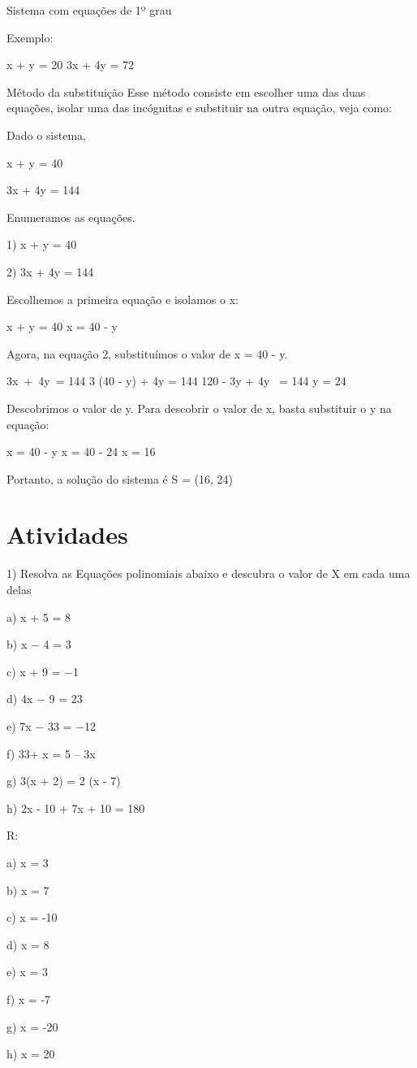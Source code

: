 Sistema com equações de 1º grau

Exemplo:

x + y = 20 3x + 4y = 72

Método da substituição Esse método consiste em escolher uma das duas
equações, isolar uma das incógnitas e substituir na outra equação, veja
como:

Dado o sistema,

x + y = 40

3x + 4y = 144

Enumeramos as equações.

1) x + y = 40

2) 3x + 4y = 144

Escolhemos a primeira equação e isolamos o x:

x + y = 40 x = 40 - y

Agora, na equação 2, substituímos o valor de x = 40 - y.

3x~+~4y~= 144 3 (40 - y) + 4y = 144 120 - 3y + 4y~ = 144 y = 24

Descobrimos o valor de y. Para descobrir o valor de x, basta substituir
o y na equação:

x = 40 - y x = 40 - 24 x = 16

Portanto, a solução do sistema é S = (16, 24)

\section{Atividades}

1) Resolva as Equações polinomiais abaixo e descubra o valor de X em
cada uma delas

a) x + 5 = 8

b) x − 4 = 3

c) x + 9 = −1

d) 4x − 9 = 23

e) 7x − 33 = −12

f) 33+ x = 5 -- 3x

g) 3(x + 2) = 2 (x - 7)

h) 2x - 10 + 7x + 10 = 180

R:

a) x = 3

b) x = 7

c) x = -10

d) x = 8

e) x = 3

f) x = -7

g) x = -20

h) x = 20

